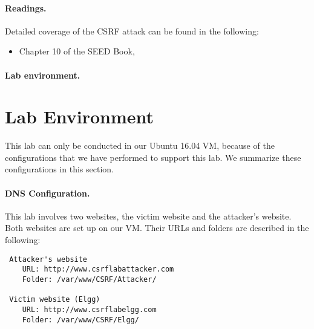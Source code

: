 \paragraph{Readings.}
Detailed coverage of the CSRF attack can be found in the following:

\begin{itemize}
\item Chapter 10 of the SEED Book, \seedbook
\end{itemize}


\paragraph{Lab environment.} \seedenvironment



\section{Lab Environment}


This lab can only be conducted in our Ubuntu 16.04 VM, because of the configurations that we
have performed to support this lab. We summarize these configurations in this
section.




\paragraph{DNS Configuration.}
This lab involves two websites, the victim website and the attacker's website. 
Both websites are set up on our VM. Their URLs and folders are 
described in the following: 


\begin{lstlisting}
 Attacker's website
    URL: http://www.csrflabattacker.com
    Folder: /var/www/CSRF/Attacker/ 
  
 Victim website (Elgg)
    URL: http://www.csrflabelgg.com 
    Folder: /var/www/CSRF/Elgg/ 
\end{lstlisting}


\newcommand{\urlorurls}{URLs }
\newcommand{\urlisorurlsare}{URLs are }






